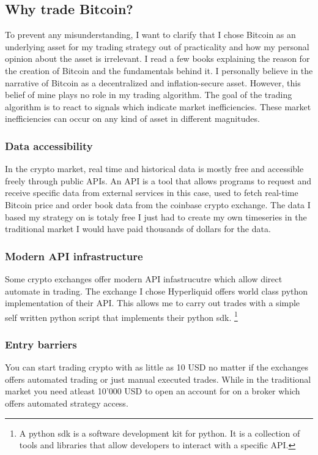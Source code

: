 \documentclass[12pt]{article}
\begin{document}
\newpage

\subsection*{Why trade Bitcoin?}
To prevent any misunderstanding, I want to clarify that I chose Bitcoin as an underlying asset for my trading strategy out of practicality and how my personal opinion about the asset is irrelevant. I read a few books explaining the reason for the creation of Bitcoin and the fundamentals behind it. I personally believe in the narrative of Bitcoin as a decentralized and inflation-secure asset. However, this belief of mine plays no role in my trading algorithm. The goal of the trading algorithm is to react to signals which indicate market inefficiencies. These market inefficiencies can occur on any kind of asset in different magnitudes.
\subsubsection*{Data accessibility}
In the crypto market, real time and historical data is mostly free and accessible freely through public APIs. An API is a tool that allows programs to request and receive specific data from external services in this case, used to fetch real-time Bitcoin price and order book data from the coinbase crypto exchange. The data I based my strategy on is totaly free I just had to create my own timeseries in the traditional market I would have paid thousands of dollars for the data.

\subsubsection*{Modern API infrastructure}
Some crypto exchanges offer modern API infastrucutre which allow direct automate in trading. The exchange I chose Hyperliquid offers world class python implementation of their API. This allows me to carry out trades with a simple self written python script that implements their python sdk. \footnote{A python sdk is a software development kit for python. It is a collection of tools and libraries that allow developers to interact with a specific API.}

\subsubsection*{Entry barriers}
You can start trading crypto with as little as 10 USD no matter if the exchanges offers automated trading or just manual executed trades. While in the traditional market you need atleast 10'000 USD to open an account for on a broker which offers automated strategy access.
\end{document}
